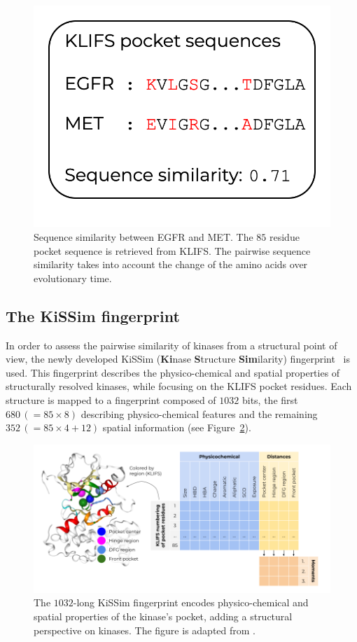 \documentclass[9pt,training]{livecoms}
\begin{document}
\begin{figure}[ht]
    \centering
    \includegraphics[width=0.5\columnwidth]{sequence_similarity.png}
    \caption{Sequence similarity between EGFR and MET. The $85$ residue pocket sequence is retrieved from KLIFS. The pairwise sequence similarity takes into account the change of the amino acids over evolutionary time.}
    \label{fig:pocket_sequence}
\end{figure}

\subsection{The KiSSim fingerprint}
In order to assess the pairwise similarity of kinases from a structural point of view, the newly developed KiSSim (\textbf{Ki}nase \textbf{S}tructure \textbf{Sim}ilarity) fingerprint~\cite{sydow_2021_kissim_chemrxiv, kissim_package} is used. This fingerprint describes the physico-chemical and spatial properties of structurally resolved kinases, while focusing on the KLIFS pocket residues. Each structure is mapped to a fingerprint composed of $1032$ bits, the first $680 \, (=85 \times 8)$ describing physico-chemical features and the remaining $352 \, (=85 \times 4 + 12)$ spatial information (see Figure~\ref{fig:kissim_similarity}).

\begin{figure}[ht]
    \centering
    \includegraphics[width=\columnwidth]{kissim_fingerprint.png}
    \caption{The $1032$-long KiSSim fingerprint encodes physico-chemical and spatial properties of the kinase's pocket, adding a structural perspective on kinases. The figure is adapted from \cite{kissim_package}.}
    \label{fig:kissim_similarity}
\end{figure}
\end{document}

